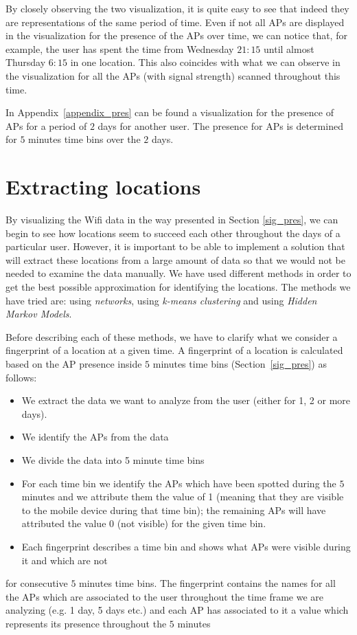 By closely observing the two visualization, it is quite easy to see that indeed
they are representations of the same period of time. Even if not all APs are
displayed in the visualization for the presence of the APs over time, we can
notice that, for example, the user has spent the time from Wednesday $21:15$
until almost Thursday $6:15$ in one location. This also coincides with what we
can observe in the visualization for all the APs (with signal strength) scanned
throughout this time.

In Appendix~\ref{appendix_pres} can be found a visualization for the presence
of APs for a period of $2$ days for another user. The presence for APs is determined for $5$
minutes time bins over the $2$ days.

\section{Extracting locations}

By visualizing the Wifi data in the way presented in Section \ref{sig_pres}, we
can begin to see how locations seem to succeed each other throughout the days of
a particular user. However, it is important to be able to implement a solution
that will extract these locations from a large amount of data so that we would
not be needed to examine the data manually. We have used different methods in
order to get the best possible approximation for identifying the locations. The
methods we have tried are: using \textit{networks}, using \textit{k-means
clustering} and using \textit{Hidden Markov Models}.

Before describing each of these methods, we have to clarify what we consider a
fingerprint of a location at a given time. A fingerprint of a location is
calculated based on the AP presence inside $5$ minutes time bins
(Section~\ref{sig_pres}) as follows:
\begin{itemize}
  \item We extract the data we want to analyze from the user (either for 1, 2
  or more days).
  \item We identify the APs from the data
  \item We divide the data into 5 minute time bins
  \item For each time bin we identify the APs which have been spotted during the
  $5$ minutes and we attribute them the value of 1 (meaning that they are
  visible to the mobile device during that time bin); the remaining APs will
  have attributed the value 0 (not visible) for the given time bin.
  \item Each fingerprint describes a time bin and shows what APs were visible
  during it and which are not
\end{itemize}
for consecutive $5$ minutes time bins.
The fingerprint contains the names for all the APs which are associated to the user throughout the time
frame we are analyzing (e.g. 1 day, 5 days etc.) and each AP has associated to
it a value which represents its presence throughout the $5$ minutes 

